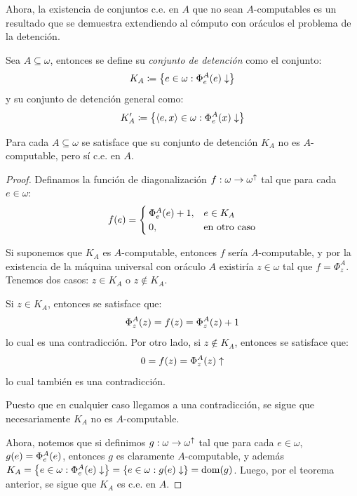 \begin{agregado}
Ahora, la existencia de conjuntos c.e. en $A$ que no sean $A$-computables es un resultado que se demuestra extendiendo al cómputo con oráculos el problema de la detención.

\begin{definition}
	\label{def: detencion_relativizados}
	Sea $A\subseteq\omega$, entonces se define su \emph{conjunto de detención} como el conjunto:
	\[
		K_{A}\coloneqq\set*{e\in\omega:\Phi_{e}^{A}\pa*{e}\ACABA}
	\]
	y su conjunto de detención general como:
	\[
		K'_{A}\coloneqq\set*{\inner*{e, x}\in\omega:\Phi_{e}^{A}\pa*{x}\ACABA}
	\]
\end{definition}

\begin{theorem}
	\label{theo: turing_relativizado}
	Para cada $A\subseteq\omega$ se satisface que su conjunto de detención $K_{A}$ no es $A$-computable, pero sí c.e. en $A$.
\end{theorem}

\begin{proof}
	Definamos la función de diagonalización $f:\omega\to\omega^{\uparrow}$ tal que para cada $e\in\omega$:
	\[
		f\pa*{e} =
		\begin{cases}
			\Phi_{e}^{A}\pa*{e} + 1, & e\in K_{A}\\
			0, &\text{en otro caso}
		\end{cases}
	\]

	Si suponemos que $K_{A}$ es $A$-computable, entonces $f$ sería $A$-computable, y por la existencia de la máquina universal con oráculo $A$ existiría $z\in\omega$ tal que $f =\Phi_{z}^{A}$. Tenemos dos casos: $z\in K_{A}$ o $z\notin K_{A}$.

	Si $z\in K_{A}$, entonces se satisface que:
	\[
		\Phi_{z}^{A}\pa*{z} = f\pa*{z} =\Phi_{z}^{A}\pa*{z} + 1
	\]
	lo cual es una contradicción. Por otro lado, si $z\notin K_{A}$, entonces se satisface que:
	\[
		0 = f\pa*{z} =\Phi_{z}^{A}\pa*{z}\DIVERGE
	\]
	lo cual también es una contradicción.

	Puesto que en cualquier caso llegamos a una contradicción, se sigue que necesariamente $K_{A}$ no es $A$-computable.

	Ahora, notemos que si definimos $g:\omega\to\omega^{\uparrow}$ tal que para cada $e\in\omega$, $g\pa*{e} =\Phi_{e}^{A}\pa*{e}$, entonces $g$ es claramente $A$-computable, y además $K_{A} =\set*{e\in\omega:\Phi_{e}^{A}\pa*{e}\ACABA} =\set*{e\in\omega: g\pa*{e}\ACABA} =\DOMINIO{g}$. Luego, por el teorema anterior, se sigue que $K_{A}$ es c.e. en $A$.
\end{proof}


\end{agregado}
